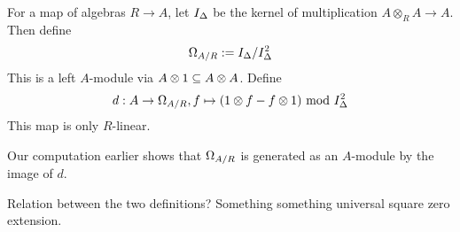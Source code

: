 \documentclass[./main.tex]{subfiles}
\begin{document}
\begin{dfn}
  
  For a map of algebras $R \to A$,
  let $I_\Delta$ be the kernel of multiplication $A \otimes_R A \to A$.
  Then define 
  \[
    \Omega_{A / R} := I_\Delta / I_\Delta^2
  \]
  This is a left $A$-module via $A \otimes 1 \subseteq A \otimes A$.
  Define \[
    d : A \to \Omega_{A / R} , f \mapsto (1 \otimes f - f \otimes 1) 
    \text{ mod } I_\Delta^2 
  \]
  This map is only $R$-linear.
\end{dfn}

Our computation earlier shows that
$\Omega_{A / R}$ is generated as an $A$-module by
the image of $d$.

Relation between the two definitions?
Something something universal square zero extension.
\end{document}
